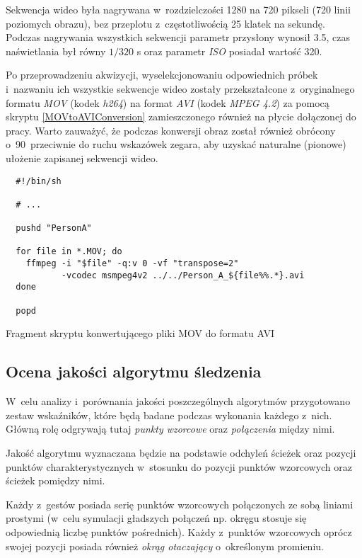       Sekwencja wideo była nagrywana w~rozdzielczości 1280 na 720 pikseli (720 linii poziomych obrazu), bez przeplotu z~częstotliwością 25 klatek na sekundę. Podczas nagrywania wszystkich sekwencji parametr przysłony wynosił 3.5, czas naświetlania był równy $1/320$ s oraz parametr \textit{ISO} posiadał wartość 320.

      Po przeprowadzeniu akwizycji, wyselekcjonowaniu odpowiednich próbek i~nazwaniu ich wszystkie sekwencje wideo zostały przekształcone z~oryginalnego formatu \textit{MOV} (kodek \textit{h264}) na format \textit{AVI} (kodek \textit{MPEG 4.2}) za pomocą skryptu \ref{MOVtoAVIConversion} zamieszczonego również na płycie dołączonej do pracy. Warto zauważyć, że podczas konwersji obraz został również obrócony o~90\degree~przeciwnie do ruchu wskazówek zegara, aby uzyskać naturalne (pionowe) ułożenie zapisanej sekwencji wideo.

        \begin{sample}[ht]
          \begin{verbatim}
  #!/bin/sh

  # ...

  pushd "PersonA"

  for file in *.MOV; do
    ffmpeg -i "$file" -q:v 0 -vf "transpose=2"
           -vcodec msmpeg4v2 ../../Person_A_${file%%.*}.avi
  done

  popd
          \end{verbatim}
          \caption{Fragment skryptu konwertującego pliki MOV do formatu AVI}
          \label{MOVtoAVIConversion}
        \end{sample}

    \subsection{Ocena jakości algorytmu śledzenia}\label{Subsection_Jakosc}

      W~celu analizy i~porównania jakości poszczególnych algorytmów przygotowano zestaw wskaźników, które będą badane podczas wykonania każdego z~nich. Główną rolę odgrywają tutaj \textit{punkty wzorcowe} oraz \textit{połączenia} między nimi.

      Jakość algorytmu wyznaczana będzie na podstawie odchyleń ścieżek oraz pozycji punktów charakterystycznych w~stosunku do pozycji punktów wzorcowych oraz ścieżek pomiędzy nimi.

      Każdy z~gestów posiada serię punktów wzorcowych połączonych ze sobą liniami prostymi (w~celu symulacji gładszych połączeń np. okręgu stosuje się odpowiednią liczbę punktów pośrednich). Każdy z~punktów wzorcowych oprócz swojej pozycji posiada również \textit{okrąg otaczający} o~określonym promieniu.

